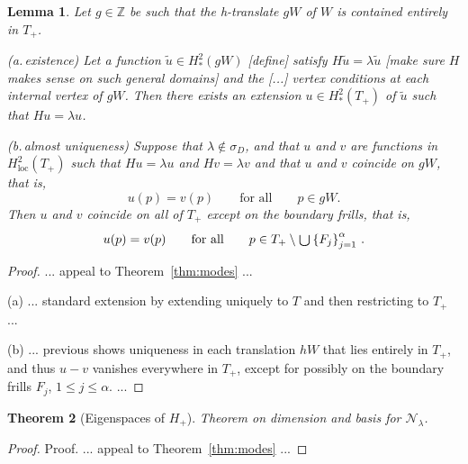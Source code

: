 \documentclass[12pt]{article}
\newtheorem{theorem}{Theorem}
\newtheorem{lemma}[theorem]{Lemma}
\newcommand{\ZZ}{\mathbb{Z}}
\newcommand{\Nlambda}{{\mathcal N}_\lambda}
\newcommand{\Hloc}{H^2_\text{loc}}
\newcommand{\notesps}[1]{{\color[rgb]{1,0.5,0}[#1]}}
\begin{document}
\begin{lemma}\label{lemma:eigenspaces}  %
Let $g\in\ZZ$ be such that the h-translate $gW$ of $W$ is contained entirely in $T_+$.

\smallskip
(a.\,existence) Let a function $\tilde u\in H^2_*(gW)$ \notesps{define} satisfy $H\tilde u=\lambda \tilde u$ \notesps{make sure $H$ makes sense on such general domains} and the \notesps{...} vertex conditions at each internal vertex of $gW$.  Then there exists an extension $u\in H^2_*(T_+)$ of $\tilde u$ such that $Hu=\lambda u$. 

\smallskip
(b.\,almost uniqueness) Suppose that $\lambda\not\in\sigma_D$, and that $u$ and $v$ are functions in $\Hloc(T_+)$ such that $H u = \lambda u$ and $H v = \lambda v$ and that $u$ and $v$ coincide on $gW$, that is,
%
\begin{equation}
  u(p) = v(p) 
  \qquad
  \text{for all}
  \qquad
  p \in g W.
\end{equation}
%
Then $u$ and $v$ coincide on all of $T_+$ except on the boundary frills, that is,
%
\begin{equation}
  u(p) = v(p) 
  \qquad
  \text{for all}
  \qquad
  p \in T_+ \setminus \raisebox{-2pt}{\text{\Large$\cup$}} \left\{ F_j \right\}_{j=1}^\alpha\,.
\end{equation}
%
\end{lemma}

\begin{proof}
    ... appeal to Theorem~\ref{thm:modes} ...

  (a) ... standard extension by extending uniquely to $T$ and then restricting to $T_+$ ...
  
  (b) ... previous shows uniqueness in each translation $hW$ that lies entirely in $T_+$, and thus $u-v$ vanishes everywhere in $T_+$, except for possibly on the boundary frills $F_j$, $1\leq j\leq\alpha$. ...
  
\end{proof}


\begin{theorem}[Eigenspaces of $H_+$]\label{thm:eigenspaces} 
  Theorem on dimension and basis for $\Nlambda$.
\end{theorem}

\begin{proof}
  Proof.
    ... appeal to Theorem~\ref{thm:modes} ...
\end{proof}
\end{document}
